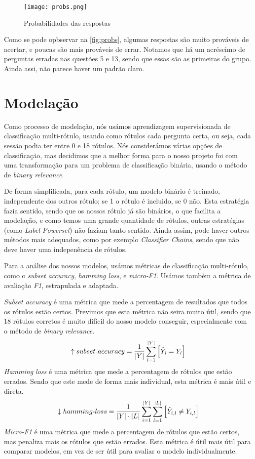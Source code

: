 \documentclass[justified, 11pt]{scrartcl}
\begin{document}
  \begin{figure}[H]
    \centering
    \texttt{[image: probs.png]}
    \caption{Probabilidades das respostas}
    \label{fig:probs}
  \end{figure}

  Como se pode opbservar na \autoref{fig:probs}, algumas respostas são muito prováveis de acertar, e poucas são mais prováveis de errar. Notamos que há um acréscimo de perguntas erradas nas questões 5 e 13, sendo que essas são as primeiras do grupo. Ainda assi, não parece haver um padrão claro.
  \section{Modelação}
  Como processo de modelação, nós usámos aprendizagem supervisionada de classificação multi-rótulo, usando como rótulos cada pergunta certa, ou seja, cada sessão podia ter entre 0 e 18 rótulos. Nós considerámos várias opções de classificação, mas decidimos que a melhor forma para o nosso projeto foi com uma transformação para um problema de classificação binária, usando o método de \textit{binary relevance}.
  
  De forma simplificada, para cada rótulo, um modelo binário é treinado, independente dos outros rótulo; se 1 o rótulo é incluido, se 0 não. Esta estratégia fazia sentido, sendo que os nossos rótulo já são binários, o que facilita a modelação, e como temos uma grande quantidade de rótulos, outras estratégias (como \textit{Label Powerset}) não faziam tanto sentido. Ainda assim, pode haver outros métodos mais adequados, como por exemplo \textit{Classifier Chains}, sendo que não deve haver uma indepenência de rótulos.

  Para a análise dos nossos modelos, usámos métricas de classificação multi-rótulo, como o \textit{subset accuracy}, \textit{hamming loss}, e \textit{micro-F1}. Usámos também a métrica de avaliação \textit{F1}, estrapulada e adaptada.

  \textit{Subset accuracy} é uma métrica que mede a percentagem de resultados que todos os rótulos estão certos. Previmos que esta métrica não seira muito útil, sendo que 18 rótulos corretos é muito difícil do nosso modelo conseguir, especialmente com o método de \textit{binary relevance}.
  $$
  \uparrow \mathnormal{subset\text{-}accuracy} = \frac{1}{|Y|} \sum_{i=1}^{|Y|}  \left[ 
    \hat{Y}_i = Y_i
    \right] 
  $$
  \textit{Hamming loss} é uma métrica que mede a percentagem de rótulos que estão errados. Sendo que este mede de forma mais individual, esta métrica é mais útil e direta.
  $$
  \downarrow \mathnormal{hamming\text{-}loss} = \frac{1}{|Y|\cdot|L|} \sum_{i=1}^{|Y|} \sum_{l=1}^{|L|} \left[ 
    \hat{Y}_{i,l} \neq Y_{i,l}
    \right]
  $$
  \textit{Micro-F1} é uma métrica que mede a percentagem de rótulos que estão certos, mas penaliza mais os rótulos que estão errados. Esta métrica é útil mais útil para comparar modelos, em vez de ser útil para avaliar o modelo individualmente.
\end{document}
